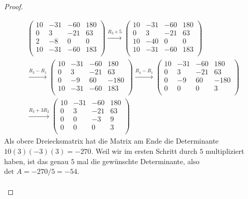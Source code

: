 \begin{proof}
	\begin{parts}
	\item 
		\begin{gather*}
		\left(
\begin{array}{cccc}
 10 & -31 & -60 & 180 \\
 0 & 3 & -21 & 63 \\
 2 & -8 & 0 & 0 \\
 10 & -31 & -60 & 183 \\
\end{array}
\right) \xrightarrow{R_3\times 5} \left(
\begin{array}{cccc}
 10 & -31 & -60 & 180 \\
 0 & 3 & -21 & 63 \\
 10 & -40 & 0 & 0 \\
 10 & -31 & -60 & 183 \\
\end{array}
\right) \\\xrightarrow{R_3-R_1} \left(
\begin{array}{cccc}
 10 & -31 & -60 & 180 \\
 0 & 3 & -21 & 63 \\
 0 & -9 & 60 & -180 \\
 10 & -31 & -60 & 183 \\
\end{array}
\right) \xrightarrow{R_4-R_1} \left(
\begin{array}{cccc}
 10 & -31 & -60 & 180 \\
 0 & 3 & -21 & 63 \\
 0 & -9 & 60 & -180 \\
 0 & 0 & 0 & 3 \\
\end{array}
\right) \\\xrightarrow{R_3+3R_2} \left(
\begin{array}{cccc}
 10 & -31 & -60 & 180 \\
 0 & 3 & -21 & 63 \\
 0 & 0 & -3 & 9 \\
 0 & 0 & 0 & 3 \\
\end{array}
\right)	
		\end{gather*}
		Als obere Dreiecksmatrix hat die Matrix am Ende die Determinante $10(3)(-3)(3)=-270$. Weil wir im ersten Schritt durch $5$ multipliziert haben, ist das genau $5$ mal die gewünschte Determinante, also $\text{det }A=-270 / 5=-54$.
\begin{gather*}

\end{gather*}
\end{parts}
\end{proof}
